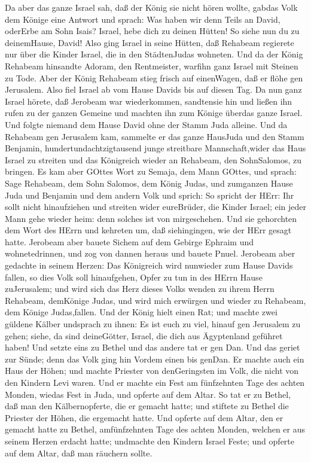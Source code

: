 Da aber das ganze Israel sah, daß der König sie nicht hören wollte,
gabdas Volk dem Könige eine Antwort und sprach: Was haben wir denn Teils
an David, oderErbe am Sohn Isais? Israel, hebe dich zu deinen Hütten! So
siehe nun du zu deinemHause, David! Also ging Israel in seine Hütten,
 daß Rehabeam regierete nur über die Kinder Israel, die in
den StädtenJudas wohneten.  Und da der König Rehabeam
hinsandte Adoram, den Rentmeister, warfihn ganz Israel mit Steinen zu
Tode. Aber der König Rehabeam stieg frisch auf einenWagen, daß er flöhe
gen Jerusalem.  Also fiel Israel ab vom Hause Davids bis
auf diesen Tag.  Da nun ganz Israel hörete, daß Jerobeam
war wiederkommen, sandtensie hin und ließen ihn rufen zu der ganzen
Gemeine und machten ihn zum Könige überdas ganze Israel. Und folgte
niemand dem Hause David ohne der Stamm Juda alleine.  Und
da Rehabeam gen Jerusalem kam, sammelte er das ganze HausJuda und den
Stamm Benjamin, hundertundachtzigtausend junge streitbare
Mannschaft,wider das Haus Israel zu streiten und das Königreich wieder
an Rehabeam, den SohnSalomos, zu bringen.  Es kam aber
GOttes Wort zu Semaja, dem Mann GOttes, und sprach:  Sage
Rehabeam, dem Sohn Salomos, dem König Judas, und zumganzen Hause Juda
und Benjamin und dem andern Volk und sprich:  So spricht
der HErr: Ihr sollt nicht hinaufziehen und streiten wider eureBrüder,
die Kinder Israel; ein jeder Mann gehe wieder heim: denn solches ist von
mirgeschehen. Und sie gehorchten dem Wort des HErrn und kehreten um, daß
siehingingen, wie der HErr gesagt hatte.  Jerobeam aber
bauete Sichem auf dem Gebirge Ephraim und wohnetedrinnen, und zog von
dannen heraus und bauete Pnuel.  Jerobeam aber gedachte in
seinem Herzen: Das Königreich wird nunwieder zum Hause Davids fallen,
 so dies Volk soll hinaufgehen, Opfer zu tun in des HErrn
Hause zuJerusalem; und wird sich das Herz dieses Volks wenden zu ihrem
Herrn Rehabeam, demKönige Judas, und wird mich erwürgen und wieder zu
Rehabeam, dem Könige Judas,fallen.  Und der König hielt
einen Rat; und machte zwei güldene Kälber undsprach zu ihnen: Es ist
euch zu viel, hinauf gen Jerusalem zu gehen; siehe, da sind deineGötter,
Israel, die dich aus Ägyptenland geführet haben!  Und
setzte eins zu Bethel und das andere tat er gen Dan.  Und
das geriet zur Sünde; denn das Volk ging hin Vordem einen bis genDan.
 Er machte auch ein Haus der Höhen; und machte Priester von
denGeringsten im Volk, die nicht von den Kindern Levi waren.
 Und er machte ein Fest am fünfzehnten Tage des achten
Monden, wiedas Fest in Juda, und opferte auf dem Altar. So tat er zu
Bethel, daß man den Kälbernopferte, die er gemacht hatte; und stiftete
zu Bethel die Priester der Höhen, die ergemacht hatte.  Und
opferte auf dem Altar, den er gemacht hatte zu Bethel, amfünfzehnten
Tage des achten Monden, welchen er aus seinem Herzen erdacht hatte;
undmachte den Kindern Israel Feste; und opferte auf dem Altar, daß man
räuchern sollte.

